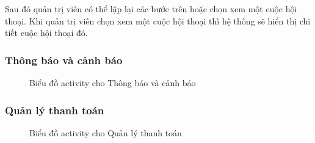 Sau đó quản trị viên có thể lặp lại các bước trên hoặc chọn xem một cuộc hội thoại. Khi quản trị viên chọn xem một cuộc hội thoại thì hệ thống sẽ hiển thị chi tiết cuộc hội thoại đó.
\subsubsection{Thông báo và cảnh báo}
\begin{figure}[H]
    \centering
     
    \vspace{0.5cm}
    \caption{Biểu đồ activity cho Thông báo và cảnh báo}
    \label{fig:enter-label}
\end{figure}
\subsubsection{Quản lý thanh toán}
\begin{figure}[H]
    \centering
     
    \vspace{0.5cm}
    \caption{Biểu đồ activity cho Quản lý thanh toán}
    \label{fig:enter-label}
\end{figure}
